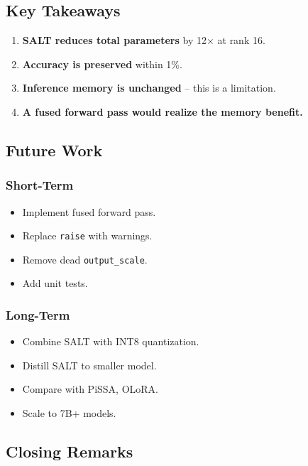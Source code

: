 \subsection{Key Takeaways}

\begin{enumerate}
\item \textbf{SALT reduces total parameters} by 12$\times$ at rank 16.
\item \textbf{Accuracy is preserved} within 1\%.
\item \textbf{Inference memory is unchanged} -- this is a limitation.
\item \textbf{A fused forward pass would realize the memory benefit.}

\end{enumerate}
\subsection{Future Work}

\subsubsection{Short-Term}

\begin{itemize}
\item Implement fused forward pass.
\item Replace \texttt{raise} with warnings.
\item Remove dead \texttt{output\_scale}.
\item Add unit tests.

\end{itemize}
\subsubsection{Long-Term}

\begin{itemize}
\item Combine SALT with INT8 quantization.
\item Distill SALT to smaller model.
\item Compare with PiSSA, OLoRA.
\item Scale to 7B+ models.

\end{itemize}
\subsection{Closing Remarks}

